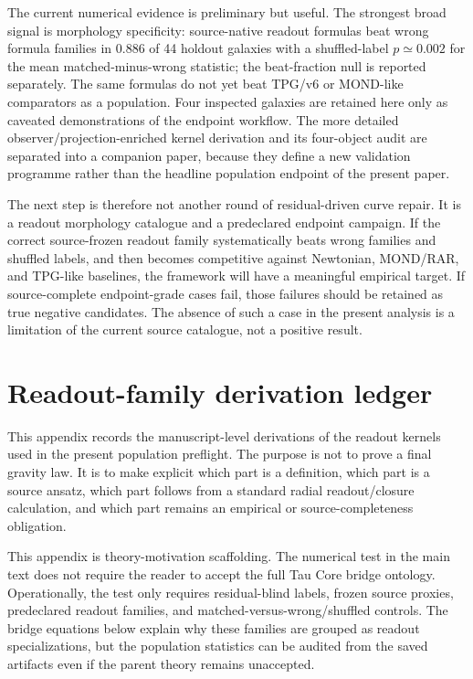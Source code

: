 \documentclass[11pt]{article}
\begin{document}
The current numerical evidence is preliminary but useful.  The strongest broad
signal is morphology specificity: source-native readout formulas beat wrong
formula families in \(0.886\) of 44 holdout galaxies with a shuffled-label
\(p\simeq0.002\) for the mean matched-minus-wrong statistic; the
beat-fraction null is reported separately.  The same formulas do not yet beat
TPG/v6 or MOND-like comparators as a population.  Four inspected galaxies are
retained here only as caveated demonstrations of the endpoint workflow.  The
more detailed observer/projection-enriched kernel derivation and its
four-object audit are separated into a companion paper, because they define a
new validation programme rather than the headline population endpoint of the
present paper.

The next step is therefore not another round of residual-driven curve repair.
It is a readout morphology catalogue and a predeclared endpoint campaign.  If
the correct source-frozen readout family systematically beats wrong families and
shuffled labels, and then becomes competitive against Newtonian, MOND/RAR, and
TPG-like baselines, the framework will have a meaningful empirical target.  If
source-complete endpoint-grade cases fail, those failures should be retained as
true negative candidates.  The absence of such a case in the present analysis
is a limitation of the current source catalogue, not a positive result.

\appendix
\section{Readout-family derivation ledger}
\label{app:readout-derivations}

This appendix records the manuscript-level derivations of the readout kernels
used in the present population preflight.  The purpose is not to prove a final
gravity law.  It is to make explicit which part is a definition, which part is
a source ansatz, which part follows from a standard radial readout/closure
calculation, and which part remains an empirical or source-completeness
obligation.

This appendix is theory-motivation scaffolding.  The numerical test in the main
text does not require the reader to accept the full Tau Core bridge ontology.
Operationally, the test only requires residual-blind labels, frozen source
proxies, predeclared readout families, and matched-versus-wrong/shuffled
controls.  The bridge equations below explain why these families are grouped
as readout specializations, but the population statistics can be audited from
the saved artifacts even if the parent theory remains unaccepted.
\end{document}
